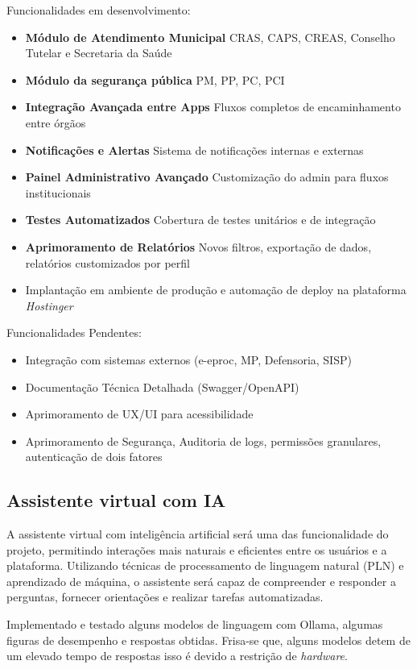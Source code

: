 Funcionalidades em desenvolvimento:
\begin{itemize}
    \item \textbf{Módulo de Atendimento Municipal} CRAS, CAPS, CREAS, Conselho Tutelar e Secretaria da Saúde
    \item \textbf{Módulo da segurança pública} PM, PP, PC, PCI
    \item \textbf{Integração Avançada entre Apps} Fluxos completos de encaminhamento entre órgãos
    \item \textbf{Notificações e Alertas} Sistema de notificações internas e externas
    \item \textbf{Painel Administrativo Avançado} Customização do admin para fluxos institucionais
    \item \textbf{Testes Automatizados} Cobertura de testes unitários e de integração
    \item \textbf{Aprimoramento de Relatórios} Novos filtros, exportação de dados, relatórios customizados por perfil
    \item Implantação em ambiente de produção e automação de deploy na plataforma \textit{Hostinger}
\end{itemize}


Funcionalidades Pendentes:
\begin{itemize}
    \item Integração com sistemas externos (e-eproc, MP, Defensoria, SISP)
    \item Documentação Técnica Detalhada (Swagger/OpenAPI)
    \item Aprimoramento de UX/UI para acessibilidade
    
    \item Aprimoramento de Segurança, Auditoria de logs, permissões granulares, autenticação de dois fatores
\end{itemize}

\subsection{Assistente virtual com IA}

\par A assistente virtual com inteligência artificial será uma das funcionalidade do projeto, permitindo interações mais naturais e eficientes entre os usuários e a plataforma. Utilizando técnicas de processamento de linguagem natural (PLN) e aprendizado de máquina, o assistente será capaz de compreender e responder a perguntas, fornecer orientações e realizar tarefas automatizadas.
\par Implementado e testado alguns modelos de linguagem com Ollama, algumas figuras de desempenho e respostas obtidas. Frisa-se que, alguns modelos detem de um elevado tempo de respostas isso é devido a restrição de \textit{hardware}.


